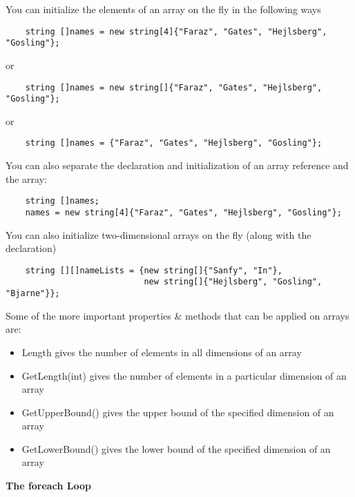You can initialize the elements of an array on the fly in the following ways

\begin{lstlisting}
    string []names = new string[4]{"Faraz", "Gates", "Hejlsberg", "Gosling"};    
\end{lstlisting}

or

\begin{lstlisting}
    string []names = new string[]{"Faraz", "Gates", "Hejlsberg", "Gosling"};    
\end{lstlisting}

or

\begin{lstlisting}
    string []names = {"Faraz", "Gates", "Hejlsberg", "Gosling"};
\end{lstlisting}

You can also separate the declaration and initialization of an array reference and the array:

\begin{lstlisting}
    string []names;
    names = new string[4]{"Faraz", "Gates", "Hejlsberg", "Gosling"};        
\end{lstlisting}

You can also initialize two-dimensional arrays on the fly (along with the declaration)

\begin{lstlisting}
    string [][]nameLists = {new string[]{"Sanfy", "In"},
                            new string[]{"Hejlsberg", "Gosling", "Bjarne"}};        
\end{lstlisting}

Some of the more important properties \& methods that can be applied on arrays are:

\begin{itemize}
    \item Length gives the number of elements in all dimensions of an array
    \item GetLength(int) gives the number of elements in a particular dimension of an array
    \item GetUpperBound() gives the upper bound of the specified dimension of an array
    \item GetLowerBound() gives the lower bound of the specified dimension of an array 
\end{itemize}


\textbf{The foreach Loop}\\

